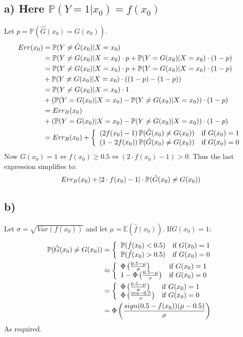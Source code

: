 \subsection*{a) Here $\mathbb{P}(Y = 1 | x_0) = f(x_0)$}
Let $p =\mathbb{P}(\hat{G}(x_0) = G(x_0))  $.
\begin{align*}
    Err(x_0) &= \mathbb{P}(Y \neq \hat{G}(x_0)\vert X = x_0) \\
     &= \mathbb{P}(Y \neq G(x_0)\vert X = x_0)\cdot p  
     +  \mathbb{P}(Y = G(x_0)\vert X = x_0) \cdot (1-p)\\
     &= \mathbb{P}(Y \neq G(x_0)\vert X = x_0)\cdot p  
     +  \mathbb{P}(Y = G(x_0)\vert X = x_0) \cdot (1-p) \\
     & + \mathbb{P}(Y \neq G(x_0)|X=x_0) \cdot ((1-p)-(1-p))\\
     &= \mathbb{P}(Y \neq G(x_0)\vert X = x_0) \cdot 1 \\
     &+  \left(\mathbb{P}(Y = G(x_0)\vert X = x_0)  -\mathbb{P}(Y \neq G(x_0)|X=x_0)\right) \cdot (1-p) \\
     &= Err_B(x_0) \\
     &+ \left(\mathbb{P}(Y = G(x_0)\vert X = x_0)  -\mathbb{P}(Y \neq G(x_0)|X=x_0)\right) \cdot (1-p) \\
     &= Err_B(x_0) + \left\{ \begin{array}{ll} \left(2 f(x_0) - 1\right) \mathbb{P}(\hat{G}(x_0) \neq G(x_0)) & \mbox{if } G(x_0) = 1 \\ \left(1 - 2 f(x_0)\right) \mathbb{P}(\hat{G}(x_0) \neq G(x_0)) & \mbox{if } G(x_0) = 0 \end{array} \right. 
\end{align*}
Now $G(x_0) = 1 \iff f(x_0) \geq 0.5 \iff \left(2\cdot f(x_0) - 1\right) > 0$.
Thus the last expression simplifies to:
$$Err_B(x_0) + \left\vert2\cdot f(x_0) - 1\right\vert \cdot \mathbb{P}(\hat{G}(x_0) \neq G(x_0))$$

\subsection*{b)}
Let $\sigma = \sqrt{Var(f(x_0))}$ and let $\mu =  \mathbb{E}(\hat{f}(x_0))$. If$G(x_0) = 1$:
\begin{align*}
    \mathbb{P}(\hat{G}(x_0) \neq G(x_0)) &=  \left\{ \begin{array}{ll} \mathbb{P}(\hat{f}(x_0) < 0.5) & \mbox{if } G(x_0) = 1 \\ \mathbb{P}(\hat{f}(x_0) > 0.5) & \mbox{if } G(x_0) = 0 \end{array} \right. \\
    &\approx \left\{ \begin{array}{ll} \Phi\left(\frac{0.5 - \mu}{\sigma}\right) & \mbox{if } G(x_0) = 1 \\ 1 - \Phi\left(\frac{0.5 - \mu}{\sigma}\right) & \mbox{if } G(x_0) = 0 \end{array} \right. \\
    &=  \left\{ \begin{array}{ll} \Phi\left(\frac{0.5 - \mu}{\sigma}\right) & \mbox{if } G(x_0) = 1 \\ \Phi\left(\frac{mu - 0.5}{\sigma}\right) & \mbox{if } G(x_0) = 0 \end{array} \right. \\
    &= \Phi\left(\frac{sign(0.5 - f(x_0))(\mu - 0.5)}{\sigma}\right)
\end{align*} 
As required.

